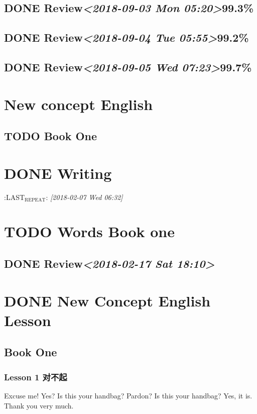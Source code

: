 \documentclass[11pt]{ctexart}
\begin{document}
\subsection{{\bfseries\sffamily DONE} Review\textit{<2018-09-03 Mon 05:20>}99.3\%}
\label{sec:orgadf4ce2}
\subsection{{\bfseries\sffamily DONE} Review\textit{<2018-09-04 Tue 05:55>}99.2\%}
\label{sec:org903785a}
\subsection{{\bfseries\sffamily DONE} Review\textit{<2018-09-05 Wed 07:23>}99.7\%}
\label{sec:org0c856a2}
\section{New concept English}
\label{sec:orgbdf3a86}
\subsection{{\bfseries\sffamily TODO} Book One}
\label{sec:orgad503a2}
\section{{\bfseries\sffamily DONE} Writing}
\label{sec:org5d96cc3}
:LAST\(_{\text{REPEAT}}\): \textit{[2018-02-07 Wed 06:32]}
\section{{\bfseries\sffamily TODO} Words Book one}
\label{sec:org903a99d}
\subsection{{\bfseries\sffamily DONE} Review\textit{<2018-02-17 Sat 18:10>}}
\label{sec:orgdcab2e6}
\section{{\bfseries\sffamily DONE} New Concept English Lesson}
\label{sec:orgde771b9}
\subsection{Book One}
\label{sec:org66e790e}
\subsubsection{Lesson 1 对不起}
\label{sec:org3cea422}
Excuse me!
Yes?
Is this your handbag?
Pardon?
Is this your handbag?
Yes, it is.
Thank you very much.
\end{document}
